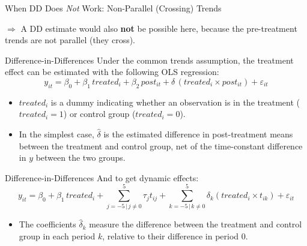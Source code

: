 \documentclass[11pt,aspectratio=169]{beamer}
\begin{document}
\begin{frame}{When DD Does \emph{Not} Work: Non-Parallel (Crossing) Trends}
  \centering
  \vspace{0.3em}
  \footnotesize $\Rightarrow$ A DD estimate would also \textbf{not} be possible here, because the pre-treatment trends are not parallel (they cross).
\end{frame}

\begin{frame}{Difference-in-Differences}
  Under the common trends assumption, the treatment effect can be estimated with the following OLS regression:
  \[
    y_{it} = \beta_0 + \beta_1\, treated_i + \beta_2\, post_{it} + \delta\,(treated_i \times post_{it}) + \varepsilon_{it} \tag{4}
  \]
  \begin{itemize}
    \item $treated_i$ is a dummy indicating whether an observation is in the treatment ($treated_i = 1$) or control group ($treated_i = 0$).
    \item In the simplest case, $\hat\delta$ is the estimated difference in post-treatment means between the treatment and control group, net of the time-constant difference in $y$ between the two groups.
  \end{itemize}
\end{frame}

\begin{frame}{Difference-in-Differences}
  And to get dynamic effects:
  \[
    y_{it} = \beta_0 + \beta_1\, treated_i + \sum_{j=-5 \,|\, j\neq 0}^{5} \tau_j t_{ij} + \sum_{k=-5 \,|\, k\neq 0}^{5} \delta_k (treated_i \times t_{ik}) + \varepsilon_{it} \tag{5}
  \]
  \begin{itemize}
    \item The coefficients $\hat\delta_k$ measure the difference between the treatment and control group in each period $k$, relative to their difference in period 0.
  \end{itemize}
\end{frame}
\end{document}
